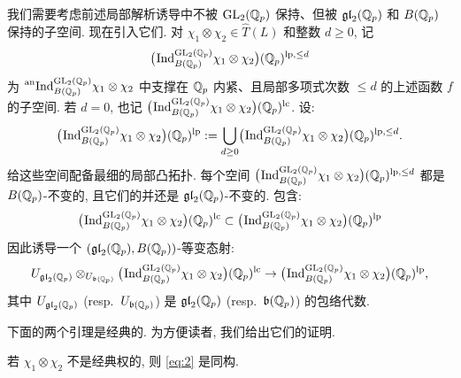 我们需要考虑前述局部解析诱导中不被 $\mathrm{GL}_2(\mathbb{Q}_p)$ 保持、但被 $\mathfrak{gl}_2(\mathbb{Q}_p)$ 和 $B(\mathbb{Q}_p)$ 保持的子空间.
现在引入它们.
对 $\chi_1 \otimes \chi_2 \in \widehat{T}(L)$ 和整数 $d \ge 0$, 记
\[
\bigl(\prescript{}{}{\mathrm{Ind}}_{B(\mathbb{Q}_p)}^{\mathrm{GL}_2(\mathbb{Q}_p)} \chi_1 \otimes \chi_2\bigr)(\mathbb{Q}_p)^{\mathrm{lp},\le d}
\]
为 $\prescript{\mathrm{an}}{}{\mathrm{Ind}}_{B(\mathbb{Q}_p)}^{\mathrm{GL}_2(\mathbb{Q}_p)} \chi_1 \otimes \chi_2$ 中支撑在 $\mathbb{Q}_p$ 内紧、且局部多项式次数 $\le d$ 的上述函数 $f$ 的子空间.
若 $d = 0$, 也记 $\bigl(\prescript{}{}{\mathrm{Ind}}_{B(\mathbb{Q}_p)}^{\mathrm{GL}_2(\mathbb{Q}_p)} \chi_1 \otimes \chi_2\bigr)(\mathbb{Q}_p)^{\mathrm{lc}}$.
设:
\[
\bigl(\prescript{}{}{\mathrm{Ind}}_{B(\mathbb{Q}_p)}^{\mathrm{GL}_2(\mathbb{Q}_p)} \chi_1 \otimes \chi_2\bigr)(\mathbb{Q}_p)^{\mathrm{lp}} := \bigcup_{d \ge 0} \bigl(\prescript{}{}{\mathrm{Ind}}_{B(\mathbb{Q}_p)}^{\mathrm{GL}_2(\mathbb{Q}_p)} \chi_1 \otimes \chi_2\bigr)(\mathbb{Q}_p)^{\mathrm{lp},\le d}.
\]
给这些空间配备最细的局部凸拓扑.
每个空间 $\bigl(\prescript{}{}{\mathrm{Ind}}_{B(\mathbb{Q}_p)}^{\mathrm{GL}_2(\mathbb{Q}_p)} \chi_1 \otimes \chi_2\bigr)(\mathbb{Q}_p)^{\mathrm{lp},\le d}$ 都是 $B(\mathbb{Q}_p)$-不变的, 且它们的并还是 $\mathfrak{gl}_2(\mathbb{Q}_p)$-不变的.
包含:
\[
\bigl(\prescript{}{}{\mathrm{Ind}}_{B(\mathbb{Q}_p)}^{\mathrm{GL}_2(\mathbb{Q}_p)} \chi_1 \otimes \chi_2\bigr)(\mathbb{Q}_p)^{\mathrm{lc}} \subset \bigl(\prescript{}{}{\mathrm{Ind}}_{B(\mathbb{Q}_p)}^{\mathrm{GL}_2(\mathbb{Q}_p)} \chi_1 \otimes \chi_2\bigr)(\mathbb{Q}_p)^{\mathrm{lp}}
\]
因此诱导一个 $(\mathfrak{gl}_2(\mathbb{Q}_p),B(\mathbb{Q}_p))$-等变态射:
\begin{equation}
\label{eq:2}
U_{\mathfrak{gl}_2(\mathbb{Q}_p)} \otimes_{U_{\mathfrak{b}(\mathbb{Q}_p)}} \bigl(\prescript{}{}{\mathrm{Ind}}_{B(\mathbb{Q}_p)}^{\mathrm{GL}_2(\mathbb{Q}_p)} \chi_1 \otimes \chi_2\bigr)(\mathbb{Q}_p)^{\mathrm{lc}} \to \bigl(\prescript{}{}{\mathrm{Ind}}_{B(\mathbb{Q}_p)}^{\mathrm{GL}_2(\mathbb{Q}_p)} \chi_1 \otimes \chi_2\bigr)(\mathbb{Q}_p)^{\mathrm{lp}},
\end{equation}
其中 $U_{\mathfrak{gl}_2(\mathbb{Q}_p)}$ (resp.\ $U_{\mathfrak{b}(\mathbb{Q}_p)}$) 是 $\mathfrak{gl}_2(\mathbb{Q}_p)$ (resp.\ $\mathfrak{b}(\mathbb{Q}_p)$) 的包络代数.

下面的两个引理是经典的.
为方便读者, 我们给出它们的证明.

\begin{lemma}\label{lem:2.1.2}
若 $\chi_1 \otimes \chi_2$ 不是经典权的, 则 \eqref{eq:2} 是同构.
\end{lemma}

